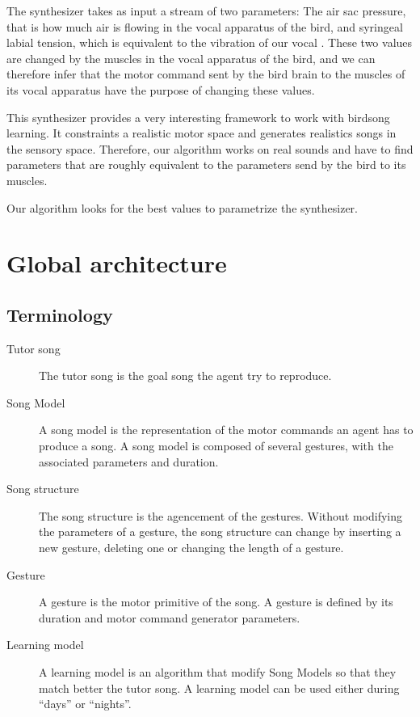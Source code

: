 \documentclass{report}
\begin{document}
The synthesizer takes as input a stream of two parameters: The air sac pressure,
that is how much air is flowing in the vocal apparatus of the bird, and
syringeal labial tension, which is equivalent to the vibration of our vocal
. These two values are changed by the muscles in the vocal
apparatus of the bird, and we can therefore infer that the motor command sent by
the bird brain to the muscles of its vocal apparatus have the purpose of
changing these values.

This synthesizer provides a very interesting framework to work with birdsong
learning. It constraints a realistic motor space and generates realistics songs
in the sensory space. Therefore, our algorithm works on real sounds and have to
find parameters that are roughly equivalent to the parameters send by the bird
to its muscles.


Our algorithm looks for the best values to parametrize the synthesizer.


\section{Global architecture}


\subsection{Terminology}

\begin{description}
  \item[Tutor song] The tutor song is the goal song the agent try to reproduce.
  \item[Song Model] A song model is the representation of the motor commands an
  agent has to produce a song. A song model is composed of several gestures,
  with the associated parameters and duration.
  \item[Song structure] The song structure is the agencement of the gestures.
  Without modifying the parameters of a gesture, the song structure can change
  by inserting a new gesture, deleting one or changing the length of a gesture.
  \item[Gesture] A gesture is the motor primitive of the song. A gesture
  is defined by its duration and motor command generator parameters.
  \item[Learning model] A learning model is an algorithm that modify Song Models
  so that they match better the tutor song. A learning model can be used either
  during ``days'' or ``nights''.
\end{description}
\end{document}
